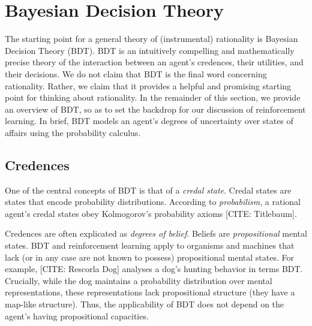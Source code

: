 \section{Bayesian Decision Theory}

The starting point for a general theory of (instrumental) rationality is Bayesian Decision Theory (BDT).
BDT is an intuitively compelling and mathematically precise theory of the interaction between an agent's credences, their utilities, and their decisions.
We do not claim that BDT is the final word concerning rationality.
Rather, we claim that it provides a helpful and promising starting point for thinking about rationality.
In the remainder of this section, we provide an overview of BDT, so as to set the backdrop for our discussion of reinforcement learning.
In brief, BDT models an agent's degrees of uncertainty over states of affairs using the probability calculus.

\subsection{Credences}
One of the central concepts of BDT is that of a \emph{credal state}.
Credal states are states that encode probability distributions.
According to \emph{probabilism}, a rational agent's credal states obey Kolmogorov's probability axioms [CITE: Titlebaum].





Credences are often explicated as \emph{degrees of belief}.
Beliefs are \emph{propositional} mental states.
BDT and reinforcement learning apply to organisms and machines that lack (or in any case are not known to possess) propositional mental states.
For example, [CITE: Rescorla Dog] analyses a dog's hunting behavior in terms BDT.
Crucially, while the dog maintains a probability distribution over mental representations, these representations lack propositional structure (they have a map-like structure).
Thus, the applicability of BDT does not depend on the agent's having propositional capacities.
